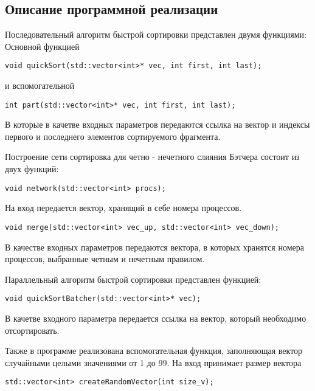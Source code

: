 \documentclass[a4paper]{report}
\begin{document}
\begin{center}
\section*{Описание программной реализации}
\end{center}
\par Последовательный алгоритм быстрой сортировки представлен двумя функциями:\\
Основной функцией 
\begin{lstlisting}
void quickSort(std::vector<int>* vec, int first, int last);
\end{lstlisting}
и вспомогательной
\begin{lstlisting}
int part(std::vector<int>* vec, int first, int last);
\end{lstlisting}
В которые в качетве входных параметров передаются ссылка на вектор и индексы первого и последнего элементов сортируемого фрагмента.
\par Построение сети сортировка для четно - нечетного слияния Бэтчера состоит из двух функций:
\begin{lstlisting}
void network(std::vector<int> procs);
\end{lstlisting}
На вход передается вектор, хранящий в себе номера процессов.
\begin{lstlisting}
void merge(std::vector<int> vec_up, std::vector<int> vec_down);
\end{lstlisting}
В качестве входных параметров передаются вектора, в которых хранятся номера процессов, выбранные четным и нечетным правилом.
\par Параллельный алгоритм быстрой сортировки представлен функцией:
\begin{lstlisting}
void quickSortBatcher(std::vector<int>* vec);
\end{lstlisting}
В качетве входного параметра передается ссылка на вектор, который необходимо отсортировать.
\par Также в программе реализована вспомогательная функция, заполняющая вектор случайными целыми значениями от 1 до 99. На вход принимает размер вектора
\begin{lstlisting}
std::vector<int> createRandomVector(int size_v);
\end{lstlisting}
\newpage
\end{document}
